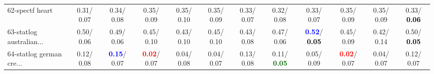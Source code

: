 \begin{table}[h]
\begin{center}
{\begin{tabular}{lc|c|c|c|c|c|c|c|c|c|c}
62-spectf heart &   0.31/  0.07 &   0.34/  0.08 &   0.35/  0.09 &   0.35/  0.10 &   0.35/  0.09 &   0.33/  0.07 &   0.32/  0.08 &   0.33/  0.07 &   0.35/  0.09 &   0.35/  0.09 &   0.33/\textcolor{black}{\textbf{  0.06}} \\
63-statlog australian... &   0.50/  0.06 &   0.49/  0.06 &   0.45/  0.10 &   0.43/  0.10 &   0.45/  0.10 &   0.43/  0.08 &   0.47/  0.06 & \textcolor{blue}{\textbf{  0.52}}/\textcolor{black}{\textbf{  0.05}} &   0.45/  0.09 &   0.42/  0.14 &   0.50/\textcolor{black}{\textbf{  0.05}} \\
64-statlog german cre... &   0.12/  0.08 & \textcolor{blue}{\textbf{  0.15}}/  0.07 & \textcolor{red}{\textbf{  0.02}}/  0.07 &   0.04/  0.08 &   0.04/  0.07 &   0.13/  0.08 &   0.11/\textcolor{darkgreen}{\textbf{  0.05}} &   0.05/  0.09 & \textcolor{red}{\textbf{  0.02}}/  0.07 &   0.04/  0.07 &   0.12/  0.07 \\\end{tabular}}\label{stratsALCKappa1aNB}
\end{center}
\end{table}
